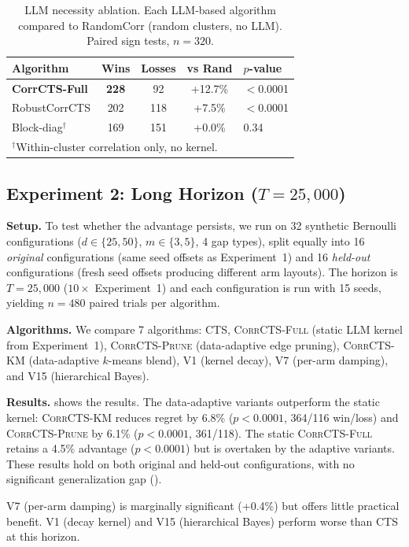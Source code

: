 \documentclass{article}
\theoremstyle{plain}
\theoremstyle{definition}
\theoremstyle{remark}
\newcommand{\CorrFull}{\textsc{CorrCTS-Full}}
\newcommand{\EdgePrune}{\textsc{CorrCTS-Prune}}
\newcommand{\KMRefine}{\textsc{CorrCTS-KM}}
\begin{document}
\begin{table}[t]
\caption{LLM necessity ablation. Each LLM-based algorithm compared to RandomCorr (random clusters, no LLM). Paired sign tests, $n = 320$.}
\label{tab:ablation}
\centering
\small
\begin{tabular}{@{}lcccl@{}}
\toprule
Algorithm & Wins & Losses & vs Rand & $p$-value \\
\midrule
\textbf{CorrCTS-Full} & \textbf{228} & 92 & +12.7\% & $<$0.0001 \\
RobustCorrCTS & 202 & 118 & +7.5\% & $<$0.0001 \\
Block-diag$^\dagger$ & 169 & 151 & +0.0\% & 0.34 \\
\bottomrule
\multicolumn{5}{l}{\footnotesize $^\dagger$Within-cluster correlation only, no kernel.}
\end{tabular}
\end{table}

\subsection{Experiment 2: Long Horizon ($T{=}25{,}000$)}\label{sec:exp2}

\textbf{Setup.}
To test whether the advantage persists, we run on 32 synthetic Bernoulli configurations ($d \in \{25, 50\}$, $m \in \{3, 5\}$, 4 gap types), split equally into 16 \emph{original} configurations (same seed offsets as Experiment~1) and 16 \emph{held-out} configurations (fresh seed offsets producing different arm layouts).
The horizon is $T = 25{,}000$ ($10\times$ Experiment~1) and each configuration is run with 15 seeds, yielding $n = 480$ paired trials per algorithm.

\textbf{Algorithms.}
We compare 7 algorithms: CTS, \CorrFull{} (static LLM kernel from Experiment~1), \EdgePrune{} (data-adaptive edge pruning), \KMRefine{} (data-adaptive $k$-means blend), V1 (kernel decay), V7 (per-arm damping), and V15 (hierarchical Bayes).

\textbf{Results.}
 shows the results.
The data-adaptive variants outperform the static kernel: \KMRefine{} reduces regret by 6.8\% ($p < 0.0001$, 364/116 win/loss) and \EdgePrune{} by 6.1\% ($p < 0.0001$, 361/118).
The static \CorrFull{} retains a 4.5\% advantage ($p < 0.0001$) but is overtaken by the adaptive variants.
These results hold on both original and held-out configurations, with no significant generalization gap ().

V7 (per-arm damping) is marginally significant (+0.4\%) but offers little practical benefit.
V1 (decay kernel) and V15 (hierarchical Bayes) perform worse than CTS at this horizon.
\end{document}
